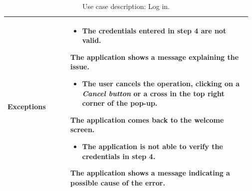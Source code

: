\begin{table}[H]
\begin{tabular}{@{}p{0.25\linewidth} p{0.72\linewidth}@{}}
		\textbf{Exceptions}         & \begin{itemize}[leftmargin=.4cm,noitemsep,topsep=0pt,before=\vspace{-3mm}]
		   \item The credentials entered in step 4 are not valid.
		\end{itemize}
		The application shows a message explaining the issue.
	    \begin{itemize}[leftmargin=.4cm,noitemsep,topsep=0pt]
		   \item The user cancels the operation, clicking on a \textit{Cancel button} or a cross in the top right corner of the pop-up.
		\end{itemize}
		The application comes back to the welcome screen.
	    \begin{itemize}[leftmargin=.4cm,noitemsep,topsep=0pt]
		   \item The application is not able to verify the credentials in step 4.
		\end{itemize}
		The application shows a message indicating a possible cause of the error.
		\\\bottomrule
	\end{tabular}
	\caption{Use case description: Log in.} 
\end{table}

